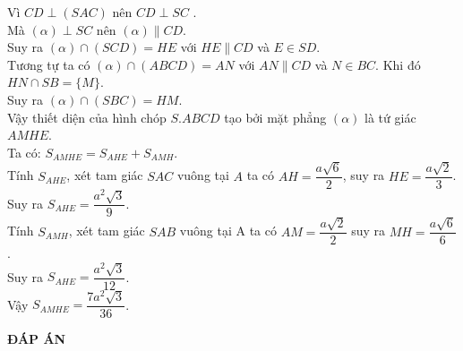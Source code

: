 \begin{bt}
{\begin{enumerate}
		Vì $CD\perp (SAC)$ nên $CD\perp SC$ .\\
		Mà $(\alpha) \perp SC$ nên $(\alpha) \parallel CD$.\\
		Suy ra $ (\alpha) \cap (SCD)=HE $ với  $HE\parallel CD$ và $E\in SD$. \\
		Tương tự ta có $ (\alpha) \cap (ABCD)=AN $ với  $AN\parallel CD$ và $N\in BC$. Khi đó $HN\cap SB=\{M\}$. \\
		Suy ra $ (\alpha) \cap (SBC)=HM$.\\
		Vậy thiết diện của hình chóp $S.ABCD$ tạo bởi mặt phẳng $(\alpha)$ là tứ giác $AMHE$.\\
		Ta có: $S_{AMHE}=S_{AHE}+S_{AMH}$.\\
		Tính $S_{AHE}$, xét tam giác $SAC$ vuông tại $A$ ta có $AH=\dfrac{a\sqrt{6}}{2}$, suy ra $HE=\dfrac{a\sqrt{2}}{3} $.\\ Suy ra  $S_{AHE}=\dfrac{a^2\sqrt{3}}{9}$.\\
		Tính $S_{AMH}$,
		 xét tam giác $SAB$ vuông tại A ta có $AM=\dfrac{a\sqrt{2}}{2}$ suy ra $MH=\dfrac{a\sqrt{6}}{6}$. \\Suy ra $S_{AHE}=\dfrac{a^2\sqrt{3}}{12}$.\\
		Vậy $S_{AMHE}=\dfrac{7a^2\sqrt{3}}{36}$.
	\end{enumerate}	
	}
\end{bt}
\newpage
\begin{center}
	\textbf{ĐÁP ÁN}
\end{center}
\begin{multicols}{10}
	
\end{multicols}
